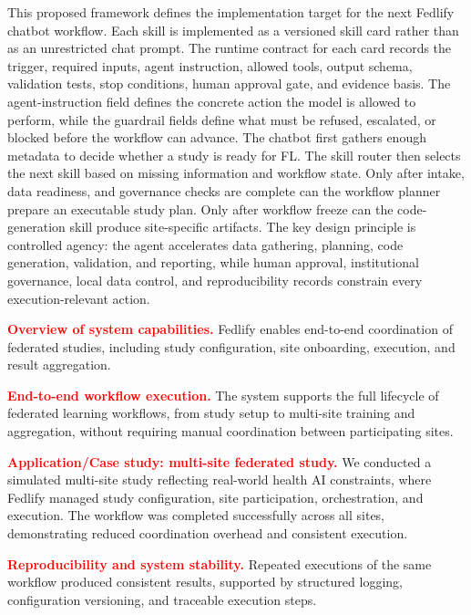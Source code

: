 \documentclass[preprint,5p, 10pt, times]{elsarticle}
\begin{document}
This proposed framework defines the implementation target for the next Fedlify chatbot workflow. 
Each skill is implemented as a versioned skill card rather than as an unrestricted chat prompt. 
The runtime contract for each card records the trigger, required inputs, agent instruction, allowed tools, output schema, validation tests, stop conditions, human approval gate, and evidence basis. 
The agent-instruction field defines the concrete action the model is allowed to perform, while the guardrail fields define what must be refused, escalated, or blocked before the workflow can advance. 
The chatbot first gathers enough metadata to decide whether a study is ready for FL. 
The skill router then selects the next skill based on missing information and workflow state. 
Only after intake, data readiness, and governance checks are complete can the workflow planner prepare an executable study plan. 
Only after workflow freeze can the code-generation skill produce site-specific artifacts. 
The key design principle is controlled agency: the agent accelerates data gathering, planning, code generation, validation, and reporting, while human approval, institutional governance, local data control, and reproducibility records constrain every execution-relevant action.



\textcolor{red}{\textbf{Overview of system capabilities.}} Fedlify enables end-to-end coordination of federated studies, including study configuration, site onboarding, execution, and result aggregation.

\textcolor{red}{\textbf{End-to-end workflow execution.}} The system supports the full lifecycle of federated learning workflows, from study setup to multi-site training and aggregation, without requiring manual coordination between participating sites.

\textcolor{red}{\textbf{Application/Case study: multi-site federated study.}} We conducted a simulated multi-site study reflecting real-world health AI constraints, where Fedlify managed study configuration, site participation, orchestration, and execution. The workflow was completed successfully across all sites, demonstrating reduced coordination overhead and consistent execution.

\textcolor{red}{\textbf{Reproducibility and system stability.}} Repeated executions of the same workflow produced consistent results, supported by structured logging, configuration versioning, and traceable execution steps.


\end{document}
